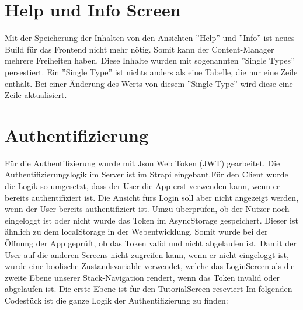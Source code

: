 \section{Help und Info Screen}

Mit der Speicherung der Inhalten von den Ansichten ''Help'' und ''Info''  ist neues Build für das Frontend nicht mehr nötig.
Somit kann der Content-Manager mehrere Freiheiten haben.
Diese Inhalte wurden mit sogenannten ''Single Types'' persestiert.
Ein ''Single Type'' ist nichts anders als eine Tabelle, die nur eine Zeile enthält.
Bei einer Änderung des Werts von diesem ''Single Type'' wird diese eine Zeile aktualisiert.

\section{Authentifizierung}
Für die Authentifizierung wurde mit Json Web Token (JWT) gearbeitet. Die Authentifizierungslogik im Server ist im Strapi eingebaut.Für den Client wurde die Logik so umgesetzt, dass der User die App erst verwenden kann, wenn er bereits authentifiziert ist.
Die Ansicht fürs Login soll aber nicht angezeigt werden, wenn der User bereits authentifiziert ist.
Umzu überprüfen, ob der Nutzer noch eingeloggt ist oder nicht wurde das Token im AsyncStorage gespeichert. Dieser ist ähnlich zu dem localStorage in der Webentwicklung. Somit wurde bei der Öffnung der App geprüft, ob das Token valid und nicht abgelaufen ist.
Damit der User auf die anderen Screens nicht zugreifen kann, wenn er nicht eingeloggt ist, wurde eine boolische Zustandsvariable verwendet, welche das LoginScreen als die zweite Ebene unserer Stack-Navigation rendert, wenn das Token invalid oder abgelaufen ist. Die erste Ebene ist für den TutorialScreen reseviert
Im folgenden Codestück ist die ganze Logik der Authentifizierung zu finden:
